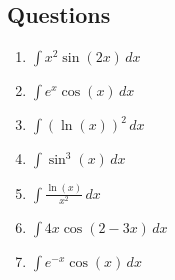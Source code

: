 \documentclass[../main.tex]{subfiles}
\begin{document}
\subsection*{Questions}
\label{DI Method}
\begin{enumerate}
    \item \(\int x^2\sin{(2x)}\, dx\)\\

    \item \(\int e^x \cos{(x)}\, dx\)\\

    \item \(\int (\ln{(x)})^2\, dx\)\\

    \item \(\int \sin^3{(x)}\,dx\)\\

    \item \(\int \frac{\ln{(x)}}{x^2}\, dx\)\\

    \item \(\int 4x\cos{(2-3x)}\, dx\)\\

    \item \(\int e^{-x}\cos{(x)}\, dx\)\\

    
\end{enumerate}


\pagebreak
\end{document}
